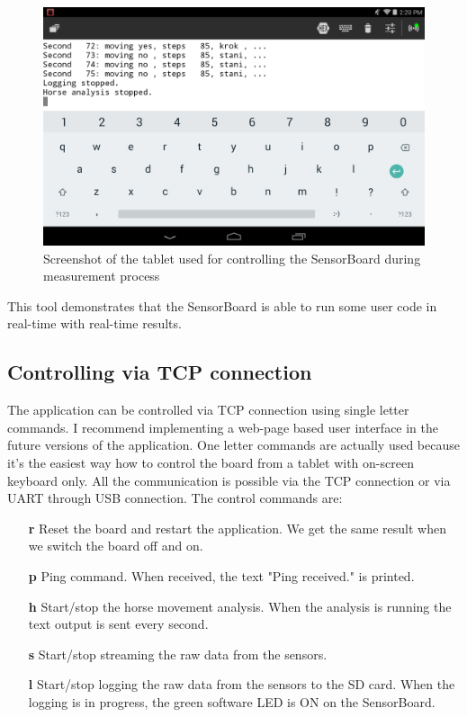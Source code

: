 \begin{figure}
	\centering
	\label{fig:HorseAnalysisTablet}
	\caption{Screenshot of the tablet used for controlling the SensorBoard during measurement process}
	\includegraphics[width=\linewidth]{img/HorseAnalysisTablet.png}
\end{figure}

This tool demonstrates that the SensorBoard is able to run some user code in real-time with real-time results.

\subsection{Controlling via \ac{TCP} connection}
The application can be controlled via \ac{TCP} connection using single letter commands. I recommend implementing a web-page based user interface in the future versions of the application. One letter commands are actually used because it's the easiest way how to control the board from a tablet with on-screen keyboard only. All the communication is possible via the \ac{TCP} connection or via UART through USB connection. The control commands are:

\begin{itemize}
	\item[\textbf{r}] Reset the board and restart the application. We get the same result when we switch the board off and on.
	\item[\textbf{p}] Ping command. When received, the text "Ping received." is printed.
	\item[\textbf{h}] Start/stop the horse movement analysis. When the analysis is running the text output is sent every second.
	\item[\textbf{s}] Start/stop streaming the raw data from the sensors.
	\item[\textbf{l}] Start/stop logging the raw data from the sensors to the SD card. When the logging is in progress, the green software LED is ON on the SensorBoard.
\end{itemize}

